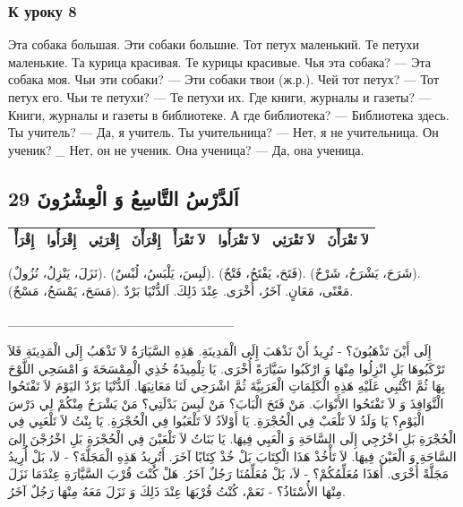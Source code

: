 \documentclass[a5paper]{article}
\begin{document}
\subsubsection{К уроку 8}
Эта собака большая. Эти собаки большие. Тот петух маленький. Те петухи маленькие. Та курица красивая. Те курицы красивые. Чья эта собака? — Эта собака моя. Чьи эти собаки? — Эти собаки твои (ж.р.). Чей тот петух? — Тот петух его. Чьи те петухи? — Те петухи их. Где книги, журналы и газеты? — Книги, журналы и газеты в библиотеке. А где библиотека? — Библиотека здесь. Ты учитель? — Да, я учитель. Ты учительница? — Нет, я не учительница. Он уче­ник? \_ Нет, он не ученик. Она ученица? — Да, она ученица.

\subsection{29 اَلدَّرْسُ التَّاسِعُ وَ الْعِشْرُونَ}

\bigskip

\begin{center}
\tablefirsthead{}
\tablehead{}
\tabletail{}
\tablelasttail{}
\begin{supertabular}{|m{0.5455598in}|m{0.7955598in}|m{0.71985984in}|m{0.7441598in}|m{0.9261598in}|m{1.1712599in}|m{1.0462599in}|m{1.0670599in}|}
\hline
إِقْرَأْ &
إِقْرَأُوا &
إِقْرَئِي &
إِقْرَأْنَ &
لاَ تَقْرَأْ &
لاَ تَقْرَأُوا &
لاَ تَقْرَئِي &
لاَ تَقْرَأْنَ\\\hline
\end{supertabular}
\end{center}
(نَزَلَ، يَنْزِلُ، نُزُولٌ). (لَبِسَ، يَلْبَسُ، لُبْسٌ). (فَتَحَ، يَفْتَحُ، فَتْحٌ). (شَرَحَ، يَشْرَحُ، شَرْحٌ). (مَسَحَ، يَمْسَحُ، مَسْحٌ). مَعْنًى، مَعَانٍ. آخَرُ، أُخْرَى. عِنْدَ ذَلِكَ. اَلدُّنْيَا بَرْدٌ.

\_\_\_\_\_\_\_\_\_\_\_\_\_\_\_\_\_\_\_\_\_\_\_\_

إِلَى أَيْنَ تَذْهَبُونَ؟ - نُرِيدُ أَنْ نَذْهَبَ إِلَى الْمَدِينَةِ. هَذِهِ السَّيَارَةُ لاَ تَذْهَبُ إِلَى الْمَدِينَةِ فَلاَ تَرْكَبُوهَا بَلِ انْزِلُوا مِنْهَا وَ ارْكَبُوا سَيَّارَةً أُخْرَى. يَا تِلْمِيذَةُ خُذِي الْمِمْسَحَةَ وَ امْسَحِي اللَّوْحَ بِهَا ثُمَّ اكْتُبِي عَلَيْهِ هَذِهِ الْكَلِمَاتِ الْعَرَبِيَّةَ ثُمَّ اشْرَحِي لَنَا مَعَانِيَهَا. اَلدُّنْيَا بَرْدٌ اليَوْمَ لاَ تَفْتَحُوا الْنَّوَافِذَ وَ لاَ تَفْتَحُوا الأَبْوَابَ. مَنْ فَتَحَ الْبَابَ؟ مَنْ لَبِسَ بَدْلَتِي؟ مَنْ يَشْرَحُ مِنْكُمْ لِي دَرْسَ الْيَوْمِ؟ يَا وَلَدُ لاَ تَلْعَبْ فِي الْحُجْرَةِ. يَا أَوْلاَدُ لاَ تَلْعَبُوا فِي الْحُجْرَةِ. يَا بِنْتُ لاَ تَلْعَبِي فِي الْحُجْرَةِ بَلِ اخْرُجِي إِلَى السَّاحَةِ وَ الْعَبِي فِيهَا. يَا بَنَاتُ لاَ تَلْعَبْنَ فِي الْحُجْرَةِ بَلِ اخْرُجْنَ إِلىَ السَّاحَةِ وَ الْعَبْنَ فِيهَا. لاَ تَأْخُذْ هَذَا الْكِتَابَ بَلْ خُذْ كِتَابًا آخَرَ. أَتُرِيدُ هَذِهِ الْمَجَلَّةَ؟ - لاَ، بَلْ أُرِيدُ مَجَلَّةً أُخْرَى. أَهَذَا مُعَلِّمُكُمْ؟ - لاَ، بَلْ مُعَلِّمُنَا رَجُلٌ آخَرُ. هَلْ كُنْتَ قُرْبَ السَّيَّارَةِ عِنْدَمَا نَزَلَ مِنْهَا الأُسْتَاذُ؟ - نَعَمْ، كُنْتُ قُرْبَهَا عِنْدَ ذَلِكَ وَ نَزَلَ مَعَهُ مِنْهَا رَجُلٌ آخَرُ.
\end{document}
